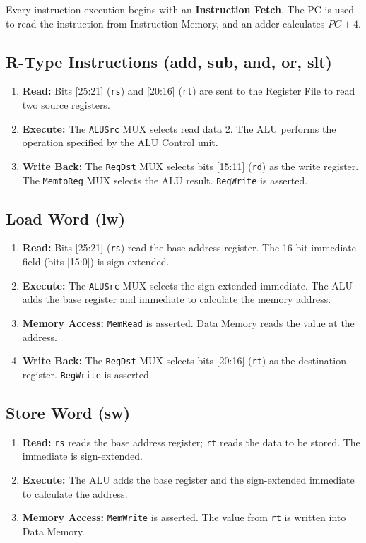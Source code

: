 \begin{remark}
Every instruction execution begins with an \textbf{Instruction Fetch}. The PC is used to read the instruction from Instruction Memory, and an adder calculates $PC + 4$.
\end{remark}

\subsection{R-Type Instructions (add, sub, and, or, slt)}
\begin{enumerate}
    \item \textbf{Read:} Bits [25:21] (\texttt{rs}) and [20:16] (\texttt{rt}) are sent to the Register File to read two source registers.
    \item \textbf{Execute:} The \texttt{ALUSrc} MUX selects read data 2. The ALU performs the operation specified by the ALU Control unit.
    \item \textbf{Write Back:} The \texttt{RegDst} MUX selects bits [15:11] (\texttt{rd}) as the write register. The \texttt{MemtoReg} MUX selects the ALU result. \texttt{RegWrite} is asserted.
\end{enumerate}

\subsection{Load Word (lw)}
\begin{enumerate}
    \item \textbf{Read:} Bits [25:21] (\texttt{rs}) read the base address register. The 16-bit immediate field (bits [15:0]) is sign-extended.
    \item \textbf{Execute:} The \texttt{ALUSrc} MUX selects the sign-extended immediate. The ALU adds the base register and immediate to calculate the memory address.
    \item \textbf{Memory Access:} \texttt{MemRead} is asserted. Data Memory reads the value at the address.
    \item \textbf{Write Back:} The \texttt{RegDst} MUX selects bits [20:16] (\texttt{rt}) as the destination register. \texttt{RegWrite} is asserted.
\end{enumerate}

\subsection{Store Word (sw)}
\begin{enumerate}
    \item \textbf{Read:} \texttt{rs} reads the base address register; \texttt{rt} reads the data to be stored. The immediate is sign-extended.
    \item \textbf{Execute:} The ALU adds the base register and the sign-extended immediate to calculate the address.
    \item \textbf{Memory Access:} \texttt{MemWrite} is asserted. The value from \texttt{rt} is written into Data Memory.
\end{enumerate}

